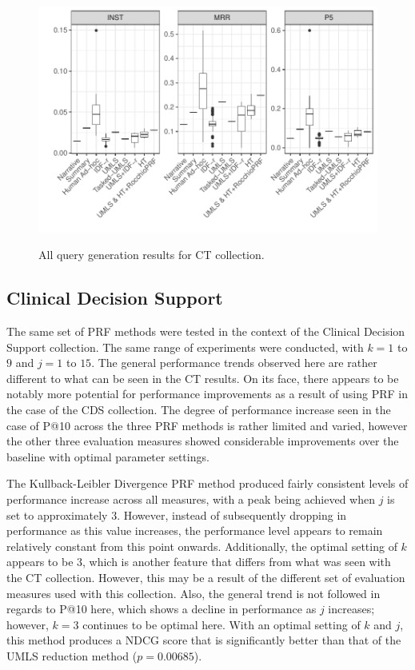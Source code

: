 \documentclass[a4paper]{report}
\begin{document}
\begin{figure}
\centering
\caption{All query generation results for CT collection.}
\includegraphics[width=.9\columnwidth]{ct-generation.pdf}
\label{ct-total}
\end{figure}


\subsection{Clinical Decision Support}
The same set of PRF methods were tested in the context of the Clinical Decision Support collection. The same range of experiments were conducted, with $k=1$ to $9$ and $j = 1$ to $15$. The general performance trends observed here are rather different to what can be seen in the CT results. On its face, there appears to be notably more potential for performance improvements as a result of using PRF in the case of the CDS collection. The degree of performance increase seen in the case of P@10 across the three PRF methods is rather limited and varied, however the other three evaluation measures showed considerable improvements over the baseline with optimal parameter settings.

The Kullback-Leibler Divergence PRF method produced fairly consistent levels of performance increase across all measures, with a peak being achieved when $j$ is set to approximately 3. However, instead of subsequently dropping in performance as this value increases, the performance level appears to remain relatively constant from this point onwards. Additionally, the optimal setting of $k$ appears to be 3, which is another feature that differs from what was seen with the CT collection. However, this may be a result of the different set of evaluation measures used with this collection. Also, the general trend is not followed in regards to P@10 here, which shows a decline  in performance as $j$ increases; however, $k = 3$ continues to be optimal here. With an optimal setting of $k$ and $j$, this method produces a NDCG score that is significantly better than that of the UMLS reduction method ($p=0.00685$).
\end{document}
